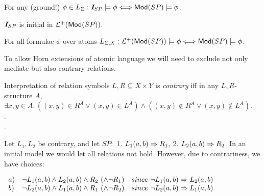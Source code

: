 \documentclass[12pt]{article}
\begin{document}
\begin{Prop}
For any (ground!) $\phi\in L_{\Sigma}: \mbox{\bf{\em I}}_{SP}\models\phi\Longleftrightarrow {\sf {Mod}}(SP)\models\phi$.
\end{Prop}

\begin{Prop}
$\mbox{\bf{\em I}}_{SP}$ is initial in ${\cal L}^+({\sf {Mod}}(SP))$.
\end{Prop}

\begin{Prop}
For all formulae $\phi$ over atoms $L_{\Sigma,X}:{\cal L}^+({\sf {Mod}}(SP))\models\phi\Longleftrightarrow {\sf {Mod}}(SP)\models \phi$.
\end{Prop}
%
To allow Horn extensions of atomic language we will need to exclude not only
mediate but also contrary relations.
\begin{Definition}
Interpretation of relation symbols $L,R\subseteq X\times Y$ is {\em contrary}
iff in any $L,R$-structure $A$, $\exists x,y\in A:
((x,y)\in R^A\lor (x,y)\in L^A) \land ((x,y)\not\in R^A\lor (x,y)\not\in
L^A)$. \\ .
\\
. 
\end{Definition}

\begin{Example}
Let $L_1,L_2$ be contrary, and let
$SP:$ 1. $L_1(a,b)\Rightarrow R_1$, 2. $L_2(a,b)\Rightarrow R_2$. In an initial
model we would let all relations not hold. However, due to contrariness, we
have choices:

$\begin{array}{lll}
a) & \neg L_1(a,b) \land L_2(a,b) \land R_2\ (\land \neg R_1) & 
   since\ \neg L_1(a,b)\Rightarrow L_2(a,b)\\
b) & \neg L_2(a,b) \land L_1(a,b) \land R_1\ (\land \neg R_2) & 
   since\ \neg L_2(a,b)\Rightarrow L_1(a,b)
\end{array}
$
\end{Example}


%
%
\end{document}
